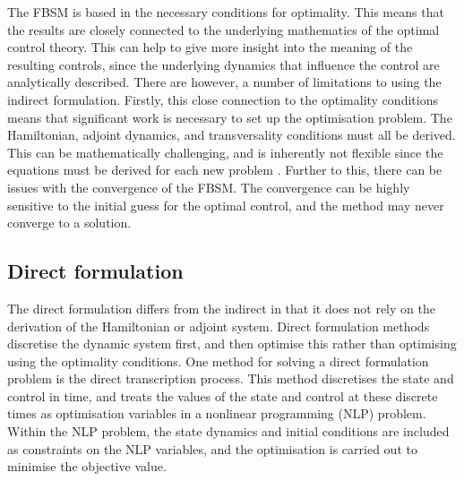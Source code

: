 The FBSM is based in the necessary conditions for optimality. This means that the results are closely connected to the underlying mathematics of the optimal control theory. This can help to give more insight into the meaning of the resulting controls, since the underlying dynamics that influence the control are analytically described. There are however, a number of limitations to using the indirect formulation. Firstly, this close connection to the optimality conditions means that significant work is necessary to set up the optimisation problem. The Hamiltonian, adjoint dynamics, and transversality conditions must all be derived. This can be mathematically challenging, and is inherently not flexible since the equations must be derived for each new problem \citep{betts_practical_2010}. Further to this, there can be issues with the convergence of the FBSM. The convergence can be highly sensitive to the initial guess for the optimal control, and the method may never converge to a solution.

\subsection{Direct formulation}

The direct formulation differs from the indirect in that it does not rely on the derivation of the Hamiltonian or adjoint system. Direct formulation methods discretise the dynamic system first, and then optimise this rather than optimising using the optimality conditions. One method for solving a direct formulation problem is the direct transcription process. This method discretises the state and control in time, and treats the values of the state and control at these discrete times as optimisation variables in a nonlinear programming (NLP) problem. Within the NLP problem, the state dynamics and initial conditions are included as constraints on the NLP variables, and the optimisation is carried out to minimise the objective value.

